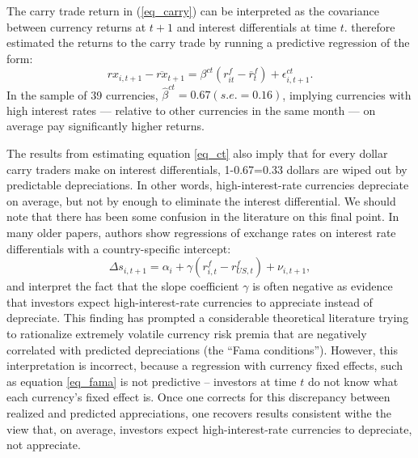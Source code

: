 The carry trade return in (\ref{eq_carry}) can be interpreted as the 
covariance between currency returns at $t+1$ and interest differentials 
at time $t$. \citet{HassanMano2015} therefore estimated the returns to 
the carry trade by running a predictive regression of the form:
\begin{equation}
  rx_{i,t+1}-\overline{rx}_{t+1}=\beta^{ct}\left(
    r^f_{it}-\overline{r}^f_{t}\right) +\epsilon
  _{i,t+1}^{ct}. 
  \label{eq_ct}
\end{equation} 
In the sample of 39 currencies, $\hat{\beta}^{ct}=0.67 (s.e.=0.16)$, 
implying currencies with high interest rates --- relative to other 
currencies in the same month --- on average pay significantly higher 
returns.




The results from estimating equation \eqref{eq_ct} also imply that for 
every dollar carry traders make on interest differentials, 1-0.67=0.33 
dollars are wiped out by predictable depreciations. In other words,
high-interest-rate currencies depreciate on average, but not by 
enough to eliminate the interest differential. We should note that 
there has been some confusion in the literature on this final point. 
In many older papers, authors show regressions of exchange rates on 
interest rate differentials with a country-specific intercept:
\begin{equation}
    \Delta s_{i,t+1} 
    = \alpha_i + \gamma \left(r^f_{i, t} - r^f_{US, t}\right) + \nu_{i, t+1},
\label{eq_fama} 
\end{equation}
and interpret the fact that the slope coefficient $\gamma$ is often 
negative as evidence that investors expect high-interest-rate 
currencies to appreciate instead of depreciate. This finding has 
prompted a considerable theoretical literature trying to rationalize 
extremely volatile currency risk premia that are negatively correlated 
with predicted depreciations (the ``Fama conditions''). However, this
interpretation is incorrect, because a regression with currency fixed
effects, such as equation \eqref{eq_fama} is not predictive -- investors at
time $t$ do not know what each currency's fixed effect is. Once one
corrects for this discrepancy between realized and predicted
appreciations, one recovers results consistent withe the view that, on
average, investors expect high-interest-rate currencies to depreciate,
not appreciate.

